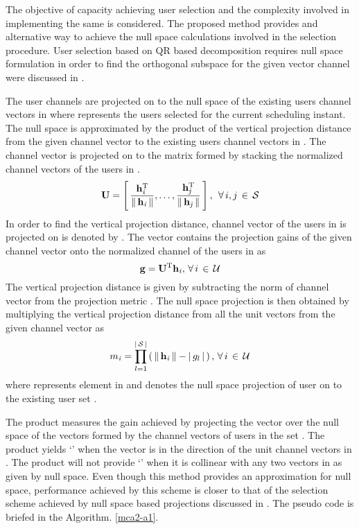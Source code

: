 
The objective of capacity achieving user selection and the complexity involved in implementing the same is considered. The proposed method provides and alternative way to achieve the null space calculations involved in the selection procedure. User selection based on QR based decomposition requires null space formulation in order to find the orthogonal subspace for the given vector channel were discussed in \cite{traniterative,zhang2007user,sun2009eigenmode}.

The user channels are projected on to the null space of the existing users channel vectors in  where  represents the users selected for the current scheduling instant. The null space is approximated by the product of the vertical projection distance from the given channel vector to the existing users channel vectors in . The channel vector  is projected on to the matrix  formed by stacking the normalized channel vectors of the users in .
\begin{equation}
\mathbf{U} = \left [ \, \frac{\mathbf{h}_{\mathit{i}}^{\mathrm{T}}}{\|\, \mathbf{h}_{\mathit{i}} \,\|}, \dotsc, \frac{\mathbf{h}_{\mathit{j}}^{\mathrm{T}}}{\|\, \mathbf{h}_{\mathit{j}} \,\|} \, \right ], \; \, \forall \, i,j \, \in \, \mathcal{S}
\label{mca2-e1}
\end{equation}
In order to find the vertical projection distance, channel vector of the users in  is projected on  is  denoted by . The vector  contains the projection gains of the given channel vector onto the normalized channel of the users in  as
\begin{equation}
\mathbf{g} = \mathbf{U}^{\mathrm{T}} \mathbf{h}_{\mathit{i}}, \, \forall \, i \, \in \, \mathcal{U}
\label{mca2-e2}
\end{equation}
The vertical projection distance is given by subtracting the norm of channel vector from the projection metric . The null space projection is then obtained by multiplying the vertical projection distance from all the unit vectors from the given channel vector as
\begin{equation}
{m}_{\mathit{i}} = \prod^{| \, \mathcal{S} \, |}_{l = 1} \left ( \, \|\, \mathbf{h}_{\mathit{i}} \,\| - | \, g_l \, | \, \right ), \, \forall \, i \, \in \, \mathcal{U}
\label{mca2-e3}
\end{equation}
where  represents  element in  and  denotes the null space projection of user  on to the existing user set .

The product measures the gain achieved by projecting the vector  over the null space of the vectors formed by the channel vectors of users in the set . The product yields `' when the vector  is in the direction of the unit channel vectors in . The product will not provide `' when it is collinear with any two vectors in  as given by null space. Even though this method provides an approximation for null space, performance achieved by this scheme is closer to that of the selection scheme achieved by null space based projections discussed in \cite{sus2006zfbf,icsps2010}. The pseudo code is briefed in the Algorithm. \ref{mca2-a1}.


